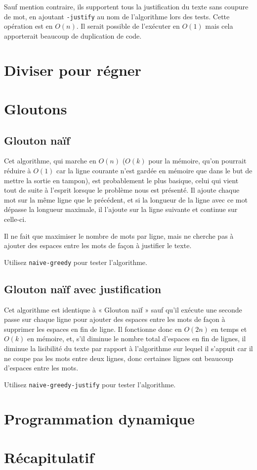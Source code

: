 \documentclass{article}
\begin{document}
Sauf mention contraire, ils supportent tous la justification du texte sans
coupure de mot, en ajoutant \verb|-justify| au nom de l'algorithme lors des
tests. Cette opération est en $O(n)$. Il serait possible de l'exécuter en $O(1)$
mais cela apporterait beaucoup de duplication de code.

\section{Diviser pour régner}

\section{Gloutons}

\subsection{Glouton naïf}

Cet algorithme, qui marche en $O(n)$ ($O(k)$ pour la mémoire, qu'on pourrait
réduire à $O(1)$ car la ligne courante n'est gardée en mémoire que dans le but
de mettre la sortie en tampon), est probablement le plus basique, celui qui
vient tout de suite à l'esprit lorsque le problème nous est présenté. Il ajoute
chaque mot sur la même ligne que le précédent, et si la longueur de la ligne
avec ce mot dépasse la longueur maximale, il l'ajoute sur la ligne suivante et
continue sur celle-ci.

Il ne fait que maximiser le nombre de mots par ligne, mais ne cherche pas à
ajouter des espaces entre les mots de façon à justifier le texte.

Utilisez \verb|naive-greedy| pour tester l’algorithme.

\subsection{Glouton naïf avec justification}

Cet algorithme est identique à « Glouton naïf » sauf qu'il exécute une seconde
passe sur chaque ligne pour ajouter des espaces entre les mots de façon à
supprimer les espaces en fin de ligne. Il fonctionne donc en $O(2n)$ en temps et
$O(k)$ en mémoire, et, s'il diminue le nombre total d'espaces en fin de lignes,
il diminue la lisibilité du texte par rapport à l'algorithme sur lequel il
s'appuit car il ne coupe pas les mots entre deux lignes, donc certaines lignes
ont beaucoup d'espaces entre les mots.

Utilisez \verb|naive-greedy-justify| pour tester l’algorithme.

\section{Programmation dynamique}

\section{Récapitulatif}
\end{document}
